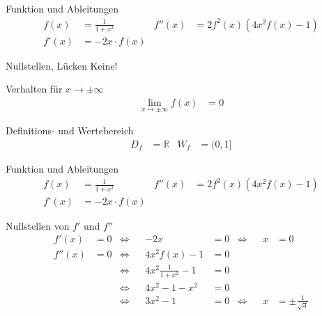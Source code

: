 \begin{taskframes}{3.105}

\begin{taskframe}
    \begin{mathbox}{Funktion und Ableitungen}
        \begin{align*}
            f(x) &= \frac{1}{1+x^2} & f''(x) &= 2 f^2(x) (4x^2 f(x) - 1) \\
            f'(x) &= -2x \cdot f(x) 
        \end{align*}
    \end{mathbox}

    \begin{tcbraster}[raster columns=2, raster equal height]
        \begin{textbox}{Nullstellen, Lücken}
            Keine!
        \end{textbox}
        \begin{mathbox}{Verhalten für $x \to \pm \infty$}
            \begin{align*}
                \lim_{x \to \pm \infty} f(x) &= 0
            \end{align*}
        \end{mathbox}
    \end{tcbraster}
    \begin{mathbox}{Definitions- und Wertebereich}
        \begin{align*}
            D_f &= \mathbb{R} & W_f &= (0, 1]
        \end{align*}
    \end{mathbox}
\end{taskframe}

\begin{taskframe}
    \begin{mathbox}{Funktion und Ableitungen}
        \begin{align*}
            f(x) &= \frac{1}{1+x^2} & f''(x) &= 2 f^2(x) (4x^2 f(x) - 1) \\
            f'(x) &= -2x \cdot f(x)
        \end{align*}
    \end{mathbox}
    \begin{mathbox}{Nullstellen von $f'$ und $f''$}
        \begin{align*}
            f'(x) &= 0 & \Leftrightarrow && -2x &= 0 & \Leftrightarrow && x &= 0 \\
            f''(x) &= 0 & \Leftrightarrow && 4x^2 f(x) - 1 &= 0 \\
            && \Leftrightarrow && 4x^2 \frac{1}{1+x^2} - 1 &= 0 \\
            && \Leftrightarrow && 4x^2 -1 -x^2 &= 0 \\
            && \Leftrightarrow && 3x^2 -1 &= 0
            & \Leftrightarrow && x &= \pm\frac{1}{\sqrt{3}}
        \end{align*}
    \end{mathbox}
\end{taskframe}


\end{taskframes}
